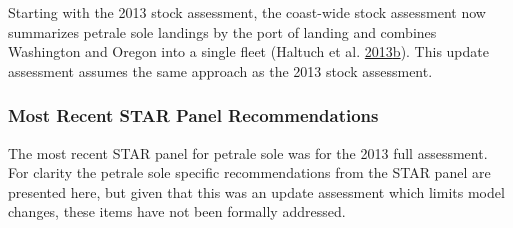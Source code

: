 \documentclass[12pt,]{article}
\begin{document}
Starting with the 2013 stock assessment, the coast-wide stock assessment
now summarizes petrale sole landings by the port of landing and combines
Washington and Oregon into a single fleet (Haltuch et al.
\protect\hyperlink{ref-haltuch_status_2013}{2013}\protect\hyperlink{ref-haltuch_status_2013}{b}).
This update assessment assumes the same approach as the 2013 stock
assessment.

\subsubsection{Most Recent STAR Panel
Recommendations}\label{most-recent-star-panel-recommendations}

The most recent STAR panel for petrale sole was for the 2013 full
assessment. For clarity the petrale sole specific recommendations from
the STAR panel are presented here, but given that this was an update
assessment which limits model changes, these items have not been
formally addressed.
\end{document}
